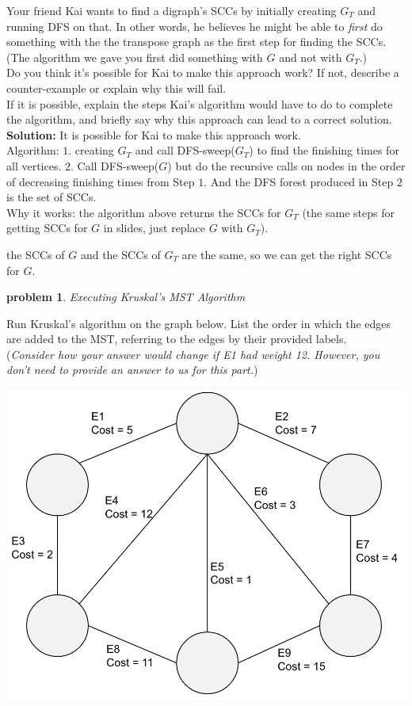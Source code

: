 \documentclass[10pt]{article}
\newcommand{\solution}[1]{\color{blue}\hfill\break\noindent\textbf{Solution:} #1\color{black}}
\newtheorem{problem}{\sc\color{cit}problem}
\begin{document}
Your friend Kai wants to find a digraph's SCCs by initially creating $G_T$ and running DFS on that. In other words, he believes he might be able to \textit{first} do something with the the transpose graph as the first step for finding the SCCs. (The algorithm we gave you first did something with $G$ and not with $G_T$.) \\
Do you think it's possible for Kai to make this approach work? If not, describe a counter-example or explain why this will fail. \\
If it is possible, explain the steps Kai's algorithm would have to do to complete the algorithm, and briefly say why this approach can lead to a correct solution.
\solution{
It is possible for Kai to make this approach work. \\
    
Algorithm:  $1$. creating $G_T$ and call DFS-sweep($G_T$) to find the finishing times for all vertices. $2$. Call DFS-sweep($G$) but do the recursive calls on nodes in the order of decreasing finishing times from Step $1$. And the DFS forest produced in Step $2$ is the set of SCCs.\\
    
Why it works: the algorithm above returns the SCCs for $G_T$ (the same steps for getting SCCs for $G$ in slides, just replace $G$ with $G_T$). 
    
the SCCs of $G$ and the SCCs of $G_T$ are the same, so we can get the right SCCs for $G$.
}

\newpage 
\begin{problem} Executing Kruskal's MST Algorithm \end{problem}
Run Kruskal's algorithm on the graph below. List the order in which the edges are added to the MST, referring to the edges by their provided labels. \\
(\emph{Consider how your answer would change if E1 had weight 12.  However, you don't need to provide an answer to us for this part.})

\includegraphics[scale=0.4]{graph_MST1}
\end{document}
